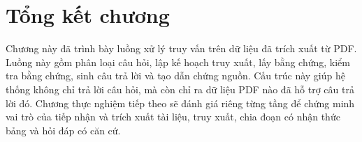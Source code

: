 \documentclass[../DoAn.tex]{subfiles}
\begin{document}
\section{Tổng kết chương}
\label{section:query-chapter-summary}

Chương này đã trình bày luồng xử lý truy vấn trên dữ liệu đã trích xuất từ PDF.
Luồng này gồm phân loại câu hỏi, lập kế hoạch truy xuất, lấy bằng chứng, kiểm tra
bằng chứng, sinh câu trả lời và tạo dẫn chứng nguồn. Cấu trúc này giúp hệ thống không chỉ
trả lời câu hỏi, mà còn chỉ ra dữ liệu PDF nào đã hỗ trợ câu trả lời đó. Chương
thực nghiệm tiếp theo sẽ đánh giá riêng từng tầng để chứng minh vai trò của tiếp nhận và trích xuất tài liệu,
truy xuất, chia đoạn có nhận thức bảng và hỏi đáp có căn cứ.
\end{document}
